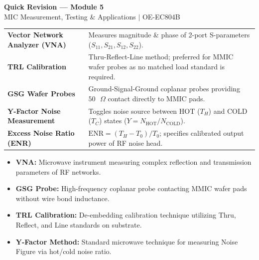 \documentclass[10pt,a4paper]{article}
\begin{document}
\newpage
\begin{center}
  {\large\bfseries\color{myred} Quick Revision --- Module 5}\\[3pt]
  {\small\color{mydark} MIC Measurement, Testing \& Applications $|$ OE-EC804B}
\end{center}
\noindent{\color{myred}\rule{\linewidth}{1.2pt}}
\vspace{4pt}

\begin{tcolorbox}[formulabox, title={\textbf{Key Concepts and Metrics at a Glance}}]
\renewcommand{\arraystretch}{1.35}
\begin{tabularx}{\linewidth}{>{\raggedright\arraybackslash\bfseries}p{4.5cm} X}
Vector Network Analyzer (VNA) & Measures magnitude \& phase of 2-port S-parameters ($S_{11}, S_{21}, S_{12}, S_{22}$). \\[4pt]
TRL Calibration & Thru-Reflect-Line method; preferred for MMIC wafer probes as no matched load standard is required. \\[4pt]
GSG Wafer Probes & Ground-Signal-Ground coplanar probes providing $50\text{ }\Omega$ contact directly to MMIC pads. \\[4pt]
Y-Factor Noise Measurement & Toggles noise source between HOT ($T_H$) and COLD ($T_C$) states ($Y = N_{\text{HOT}}/N_{\text{COLD}}$). \\[4pt]
Excess Noise Ratio (ENR) & $\text{ENR} = (T_H - T_0)/T_0$; specifies calibrated output power of RF noise head. \\
\end{tabularx}
\end{tcolorbox}

\begin{tcolorbox}[defbox, title={\textbf{One-Line Definitions}}]
  \begin{itemize}[leftmargin=*, noitemsep]
    \item \textbf{VNA:} Microwave instrument measuring complex reflection and transmission parameters of RF networks.
    \item \textbf{GSG Probe:} High-frequency coplanar probe contacting MMIC wafer pads without wire bond inductance.
    \item \textbf{TRL Calibration:} De-embedding calibration technique utilizing Thru, Reflect, and Line standards on substrate.
    \item \textbf{Y-Factor Method:} Standard microwave technique for measuring Noise Figure via hot/cold noise ratio.
  \end{itemize}
\end{tcolorbox}
\end{document}
